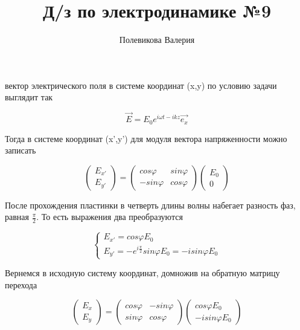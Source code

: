 \documentclass[12pt,a4paper]{article}
\author{Полевикова Валерия}
\title{Д/з по электродинамике №9}
\begin{document}
\maketitle

\section{}

вектор электрического поля в системе координат (x,y) по условию задачи выглядит так 

\begin{equation}
\vec{E} = E_0 e^{i\omega t - ikz} \vec{e_x}
\end{equation}

Тогда в системе координат (x',y') для модуля вектора напряженности можно записать

\begin{equation}
\begin{pmatrix}
E_{x'} \\
E_{y'}
\end{pmatrix}
=
\begin{pmatrix}
cos\varphi& sin\varphi \\
-sin\varphi& cos\varphi
\end{pmatrix}
\begin{pmatrix}
E_{0} \\
0
\end{pmatrix}
\end{equation}

После прохождения пластинки в четверть длины волны набегает разность фаз, равная $\frac{\pi}{2}$. То есть выражения два преобразуются 

\begin{equation}
\begin{cases}
E_{x'} = cos\varphi E_{0} \\
E_{y'} = -e^{i\frac{\pi}2}sin\varphi E_{0} = -i sin\varphi E_{0} 
\end{cases}
\end{equation}

Вернемся в исходную систему координат, домножив на обратную матрицу перехода

\begin{equation}
\begin{pmatrix}
E_{x} \\
E_{y}
\end{pmatrix}
=
\begin{pmatrix}
cos\varphi& -sin\varphi \\
sin\varphi& cos\varphi
\end{pmatrix}
\begin{pmatrix}
cos\varphi E_{0} \\
-i sin\varphi E_{0} 
\end{pmatrix}
\end{equation}
\end{document}

